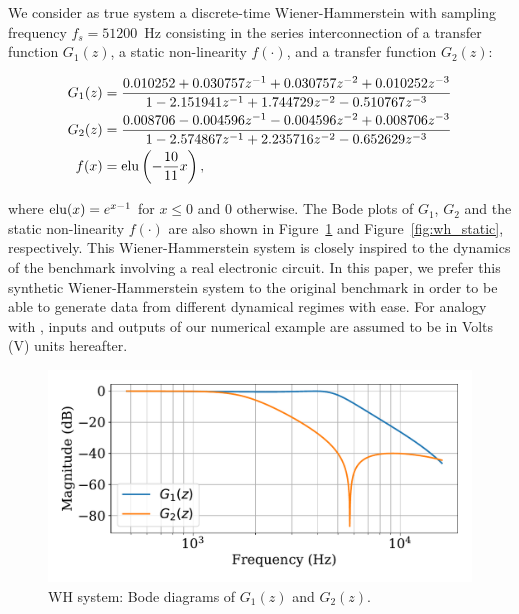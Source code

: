 \documentclass{article}
\begin{document}
We consider as true system a discrete-time Wiener-Hammerstein with sampling frequency $f_s=51200$~Hz consisting in the series interconnection of a transfer function $G_1(z)$, a static non-linearity $f(\cdot)$, and a transfer function $G_2(z)$:
\begin{small}
\begin{align*}
 G_1(z) &= \frac{0.010252 + 0.030757z^{-1} + 0.030757z^{-2} + 0.010252z^{-3}}{ 1 -2.151941z^{-1} + 1.744729z^{-2} -0.510767z^{-3}}\\
 G_2(z) &= \frac{0.008706 -0.004596z^{-1} - 0.004596z^{-2} + 0.008706z^{-3}}{1 -2.574867z^{-1} + 2.235716z^{-2} -0.652629z^{-3}}\\
 f(x) &= {\rm elu}\left (-\frac{10}{11}x \right ),
 \end{align*}
\end{small}
where ${\rm elu}(x) = e^{x-1}$ for $x \leq 0$ and $0$ otherwise.
The Bode plots of $G_1$, $G_2$ and the static non-linearity $f(\cdot)$ are also shown in Figure~\ref{fig:wh_bode} and Figure~\ref{fig:wh_static}, respectively.
{
This Wiener-Hammerstein system is closely inspired to the dynamics of the benchmark \citet{schoukens2009wiener} involving a real electronic circuit. In this paper, we prefer this synthetic Wiener-Hammerstein system to the original benchmark in order to be able to generate data from different dynamical regimes with ease.} %
{For analogy with \citet{schoukens2009wiener}, inputs and outputs of our numerical example are assumed to be in Volts (V) units hereafter.}
\begin{figure}
 \centering
 \includegraphics[width=.8\linewidth]{img/wh_bode_mag.pdf}
 \caption{WH system: Bode diagrams of $G_1(z)$ and $G_2(z)$.}
 \label{fig:wh_bode}
\end{figure}
\end{document}
